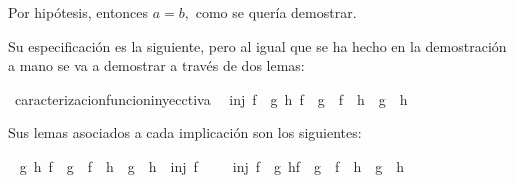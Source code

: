\begin{isabellebody}
\begin{isamarkuptext}
\begin {demostracion}
Por hipótesis, entonces $a = b,$ como se quería demostrar.
\end {demostracion}%
\end{isamarkuptext}\isamarkuptrue%
%
\isadelimdocument
%
\endisadelimdocument
%
\isatagdocument
%
\isamarkuptrue%
%
\endisatagdocument
{\isafolddocument}%
%
\isadelimdocument
%
\endisadelimdocument
%
\begin{isamarkuptext}%
Su especificación es la siguiente, pero al igual que se ha  hecho en
 la demostración a mano se va a demostrar a través de dos lemas:%
\end{isamarkuptext}\isamarkuptrue%
\isamarkupfalse%
\ caracterizacion{\isacharunderscore}funcion{\isacharunderscore}inyecctiva{\isacharcolon}\isanewline
\ \ {\isachardoublequoteopen}inj\ f\ {\isasymlongleftrightarrow}\ {\isacharparenleft}{\isasymforall}g\ h{\isachardot}\ {\isacharparenleft}f\ {\isasymcirc}\ g\ {\isacharequal}\ f\ {\isasymcirc}\ h{\isacharparenright}\ {\isasymlongrightarrow}\ {\isacharparenleft}g\ {\isacharequal}\ h{\isacharparenright}{\isacharparenright}{\isachardoublequoteclose}\isanewline
%
\isadelimproof
\ \ %
\endisadelimproof
%
\isatagproof
{}\isamarkupfalse%
%
\endisatagproof
{\isafoldproof}%
%
\isadelimproof
%
\endisadelimproof
%
\begin{isamarkuptext}%
Sus lemas asociados a cada implicación son los siguientes:%
\end{isamarkuptext}\isamarkuptrue%
\isamarkupfalse%
\ \isanewline
{\isachardoublequoteopen}{\isasymforall}g\ h{\isachardot}\ {\isacharparenleft}f\ {\isasymcirc}\ g\ {\isacharequal}\ f\ {\isasymcirc}\ h\ {\isasymlongrightarrow}\ g\ {\isacharequal}\ h{\isacharparenright}\ {\isasymLongrightarrow}\ inj\ f{\isachardoublequoteclose}\isanewline
%
\isadelimproof
\ \ %
\endisadelimproof
%
\isatagproof
{}\isamarkupfalse%
%
\endisatagproof
{\isafoldproof}%
%
\isadelimproof
\isanewline
%
\endisadelimproof
\isanewline
{}\isamarkupfalse%
\ \isanewline
{\isachardoublequoteopen}inj\ f\ {\isasymLongrightarrow}\ {\isacharparenleft}{\isasymforall}g\ h{\isachardot}{\isacharparenleft}f\ {\isasymcirc}\ g\ {\isacharequal}\ f\ {\isasymcirc}\ h{\isacharparenright}\ {\isasymlongrightarrow}\ {\isacharparenleft}g\ {\isacharequal}\ h{\isacharparenright}{\isacharparenright}{\isachardoublequoteclose}\isanewline
%
\isadelimproof
\ \ %
\endisadelimproof
%
\isatagproof
{}\isamarkupfalse%
%
\endisatagproof
{\isafoldproof}%
%
\isadelimproof
%
\endisadelimproof

\end{isabellebody}
